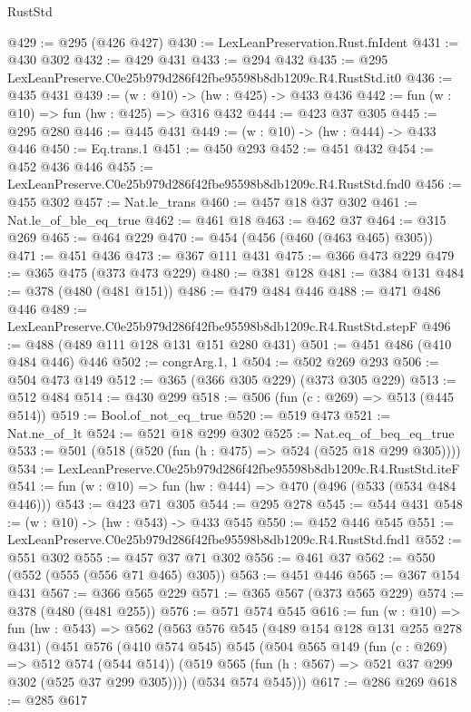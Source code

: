 \begin{lexlean}{RustStd}
\begin{coremodule}
@429 := @295 (@426 @427)
@430 := LexLeanPreservation.Rust.fnIdent
@431 := @430 @302
@432 := @429 @431
@433 := @294 @432
@435 := @295 LexLeanPreserve.C0e25b979d286f42fbe95598b8db1209c.R4.RustStd.it0
@436 := @435 @431
@439 := (w : @10) -> (hw : @425) -> @433 @436
@442 := fun (w : @10) => fun (hw : @425) => @316 @432
@444 := @423 @37 @305
@445 := @295 @280
@446 := @445 @431
@449 := (w : @10) -> (hw : @444) -> @433 @446
@450 := Eq.trans.{1}
@451 := @450 @293
@452 := @451 @432
@454 := @452 @436 @446
@455 := LexLeanPreserve.C0e25b979d286f42fbe95598b8db1209c.R4.RustStd.fnd0
@456 := @455 @302
@457 := Nat.le_trans
@460 := @457 @18 @37 @302
@461 := Nat.le_of_ble_eq_true
@462 := @461 @18
@463 := @462 @37
@464 := @315 @269
@465 := @464 @229
@470 := @454 (@456 (@460 (@463 @465) @305))
@471 := @451 @436
@473 := @367 @111 @431
@475 := @366 @473 @229
@479 := @365 @475 (@373 @473 @229)
@480 := @381 @128
@481 := @384 @131
@484 := @378 (@480 (@481 @151))
@486 := @479 @484 @446
@488 := @471 @486 @446
@489 := LexLeanPreserve.C0e25b979d286f42fbe95598b8db1209c.R4.RustStd.stepF
@496 := @488 (@489 @111 @128 @131 @151 @280 @431)
@501 := @451 @486 (@410 @484 @446) @446
@502 := congrArg.{1, 1}
@504 := @502 @269 @293
@506 := @504 @473 @149
@512 := @365 (@366 @305 @229) (@373 @305 @229)
@513 := @512 @484
@514 := @430 @299
@518 := @506 (fun (c : @269) => @513 (@445 @514))
@519 := Bool.of_not_eq_true
@520 := @519 @473
@521 := Nat.ne_of_lt
@524 := @521 @18 @299 @302
@525 := Nat.eq_of_beq_eq_true
@533 := @501 (@518 (@520 (fun (h : @475) => @524 (@525 @18 @299 @305))))
@534 := LexLeanPreserve.C0e25b979d286f42fbe95598b8db1209c.R4.RustStd.iteF
@541 := fun (w : @10) => fun (hw : @444) => @470 (@496 (@533 (@534 @484 @446)))
@543 := @423 @71 @305
@544 := @295 @278
@545 := @544 @431
@548 := (w : @10) -> (hw : @543) -> @433 @545
@550 := @452 @446 @545
@551 := LexLeanPreserve.C0e25b979d286f42fbe95598b8db1209c.R4.RustStd.fnd1
@552 := @551 @302
@555 := @457 @37 @71 @302
@556 := @461 @37
@562 := @550 (@552 (@555 (@556 @71 @465) @305))
@563 := @451 @446
@565 := @367 @154 @431
@567 := @366 @565 @229
@571 := @365 @567 (@373 @565 @229)
@574 := @378 (@480 (@481 @255))
@576 := @571 @574 @545
@616 := fun (w : @10) =>
  fun (hw : @543) =>
  @562
    (@563
      @576
      @545
      (@489 @154 @128 @131 @255 @278 @431)
      (@451
        @576
        (@410 @574 @545)
        @545
        (@504
          @565
          @149
          (fun (c : @269) => @512 @574 (@544 @514))
          (@519 @565 (fun (h : @567) => @521 @37 @299 @302 (@525 @37 @299 @305))))
        (@534 @574 @545)))
@617 := @286 @269
@618 := @285 @617

\end{coremodule}
\end{lexlean}
